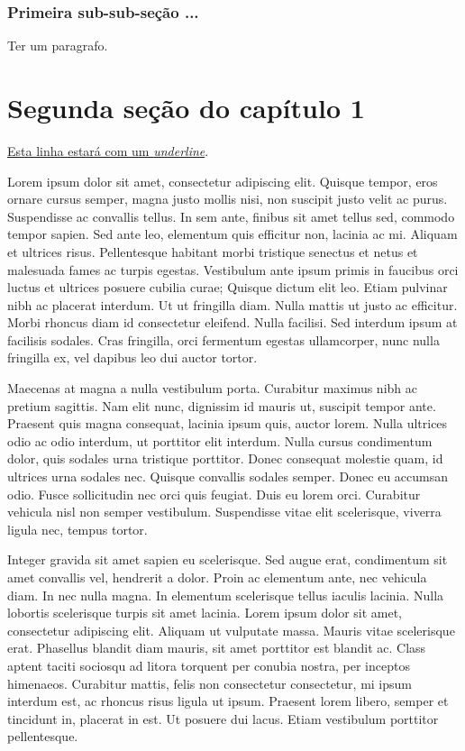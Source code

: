 \subsubsection{Primeira sub-sub-seção ...}
Ter um paragrafo.

\section{Segunda seção do capítulo 1}

\underline{Esta linha estará com um \textit{underline}}.

Lorem ipsum dolor sit amet, consectetur adipiscing elit. Quisque tempor, eros ornare cursus semper, magna justo mollis nisi, non suscipit justo velit ac purus. Suspendisse ac convallis tellus. In sem ante, finibus sit amet tellus sed, commodo tempor sapien. Sed ante leo, elementum quis efficitur non, lacinia ac mi. Aliquam et ultrices risus. Pellentesque habitant morbi tristique senectus et netus et malesuada fames ac turpis egestas. Vestibulum ante ipsum primis in faucibus orci luctus et ultrices posuere cubilia curae; Quisque dictum elit leo. Etiam pulvinar nibh ac placerat interdum. Ut ut fringilla diam. Nulla mattis ut justo ac efficitur. Morbi rhoncus diam id consectetur eleifend. Nulla facilisi. Sed interdum ipsum at facilisis sodales. Cras fringilla, orci fermentum egestas ullamcorper, nunc nulla fringilla ex, vel dapibus leo dui auctor tortor.

Maecenas at magna a nulla vestibulum porta. Curabitur maximus nibh ac pretium sagittis. Nam elit nunc, dignissim id mauris ut, suscipit tempor ante. Praesent quis magna consequat, lacinia ipsum quis, auctor lorem. Nulla ultrices odio ac odio interdum, ut porttitor elit interdum. Nulla cursus condimentum dolor, quis sodales urna tristique porttitor. Donec consequat molestie quam, id ultrices urna sodales nec. Quisque convallis sodales semper. Donec eu accumsan odio. Fusce sollicitudin nec orci quis feugiat. Duis eu lorem orci. Curabitur vehicula nisl non semper vestibulum. Suspendisse vitae elit scelerisque, viverra ligula nec, tempus tortor.

Integer gravida sit amet sapien eu scelerisque. Sed augue erat, condimentum sit amet convallis vel, hendrerit a dolor. Proin ac elementum ante, nec vehicula diam. In nec nulla magna. In elementum scelerisque tellus iaculis lacinia. Nulla lobortis scelerisque turpis sit amet lacinia. Lorem ipsum dolor sit amet, consectetur adipiscing elit. Aliquam ut vulputate massa. Mauris vitae scelerisque erat. Phasellus blandit diam mauris, sit amet porttitor est blandit ac. Class aptent taciti sociosqu ad litora torquent per conubia nostra, per inceptos himenaeos. Curabitur mattis, felis non consectetur consectetur, mi ipsum interdum est, ac rhoncus risus ligula ut ipsum. Praesent lorem libero, semper et tincidunt in, placerat in est. Ut posuere dui lacus. Etiam vestibulum porttitor pellentesque.

